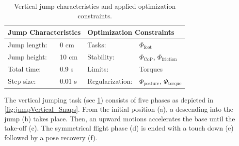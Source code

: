 \begin{table}[t]
\centering
\caption[Vertical jump characteristics and optimization constraints]{Vertical jump characteristics and applied optimization constraints.}
\begin{tabular}{|ll|ll|}
\hline
\multicolumn{2}{|l|}{\textbf{Jump Characteristics}} & \multicolumn{2}{l|}{\textbf{Optimization Constraints}} \\ \hline
Jump length:& 0 cm 	& Tasks: 			& $\Phi_{\text{foot}}$ \\ \hline
Jump height:& 10 cm	& Stability:    		& $\Phi_{\text{CoP}}$, $\Phi_{\text{friction}}$\\ \hline
Total time:& 0.9 s 	& Limits: 			& Torques\\ \hline
Step size:& 0.01 s 	& Regularization: 	& $\Phi_{\text{posture}}$, $\Phi_{\text{torque}}$\\ \hline
\end{tabular}
\label{tab:jumpVertical}
\end{table}

The vertical jumping task (see \cref{tab:jumpVertical}) consists of five phases as depicted in \cref{fig:jumpVertical_Snaps}. From the initial position (a), a descending into the jump (b) takes place. Then, an upward motions accelerates the base until the take-off (c). The symmetrical flight phase (d) is ended with a touch down (e) followed by a pose recovery (f). 

